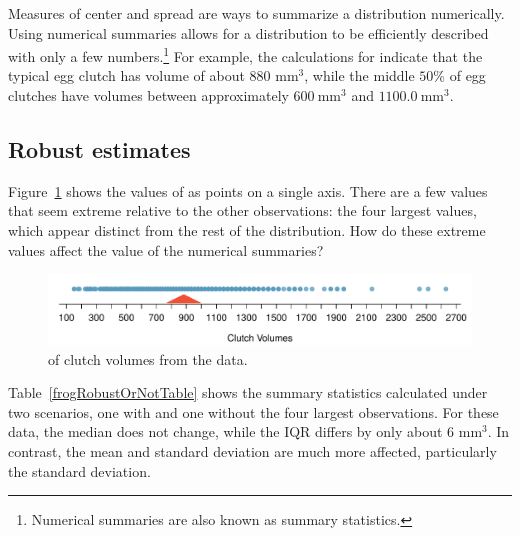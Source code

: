 Measures of center and spread are ways to summarize a distribution numerically. Using numerical summaries allows for a distribution to be efficiently described with only a few numbers.\footnote{Numerical summaries are also known as summary statistics.} For example, the calculations for  indicate that the typical egg clutch has volume of about 880 mm$^3$, while the middle $50\%$ of egg clutches have volumes between approximately $600\ \textrm{mm}^{3}$ and $1100.0\ \textrm{mm}^{3}$.

\subsection{Robust estimates}

Figure~\ref{frogClutchVolDotPlot} shows the values of  as points on a single axis. There are a few values that seem extreme relative to the other observations: the four largest values, which appear distinct from the rest of the distribution. How do these extreme values affect the value of the numerical summaries?

\begin{figure}[ht]
	\centering
	\includegraphics[width=\textwidth]{ch_intro_to_data_oi_biostat/figures/frogClutchVolDotPlot/frogClutchVolDotPlot}
	\caption{ of clutch volumes from the  data.}
	\label{frogClutchVolDotPlot}
\end{figure}

Table~\ref{frogRobustOrNotTable} shows the summary statistics calculated under two scenarios, one with and one without the four largest observations. For these data, the median does not change, while the IQR differs by only about 6 $\textrm{mm}^{3}$. In contrast, the mean and standard deviation are much more affected, particularly the standard deviation.

